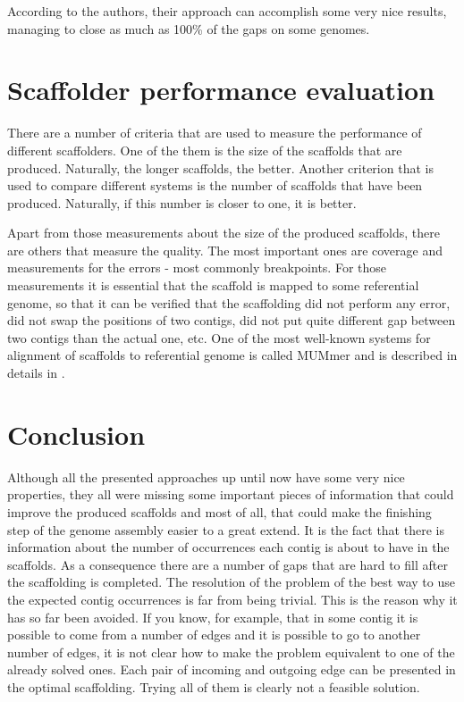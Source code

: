 \documentclass[11pt]{article}
\begin{document}
According to the authors, their approach can accomplish some very nice results,
managing to close as much as 100\% of the gaps on some genomes.


\section{Scaffolder performance evaluation} %
\label{sec:Scaffolder performance evaluation}
There are a number of criteria that are used to measure the performance of
different scaffolders. One of the them is the size of the scaffolds that are
produced. Naturally, the longer scaffolds, the better. Another criterion that is
used to compare different systems is the number of scaffolds that have been
produced. Naturally, if this number is closer to one, it is better.

Apart from those measurements about the size of the produced scaffolds, there
are others that measure the quality. The most important ones are coverage and
measurements for the errors - most commonly breakpoints. For those measurements
it is essential that the scaffold is mapped to some referential genome, so that
it can be verified that the scaffolding did not perform any error, did not swap
the positions of two contigs, did not put quite different gap between two
contigs than the actual one, etc. One of the most well-known systems for
alignment of scaffolds to referential genome is called MUMmer and is described
in details in \cite{MUMmer}.

\section{Conclusion} %
\label{sec:Conclusion}
Although all the presented approaches up until now have some very nice
properties, they all were missing some important pieces of information that
could improve the produced scaffolds and most of all, that could make the
finishing step of the genome assembly easier to a great extend. It is the fact
that there is information about the number of occurrences each contig is about
to have in the scaffolds. As a consequence there are a number of gaps that are
hard to fill after the scaffolding is completed. The resolution of the problem
of the best way to use the expected contig occurrences is far from being
trivial. This is the reason why it has so far been avoided. If you know, for
example, that in some contig it is possible to come from a number of edges and
it is possible to go to another number of edges, it is not clear how to make the
problem equivalent to one of the already solved ones. Each pair of incoming and
outgoing edge can be presented in the optimal scaffolding. Trying all of them is
clearly not a feasible solution.
\end{document}

